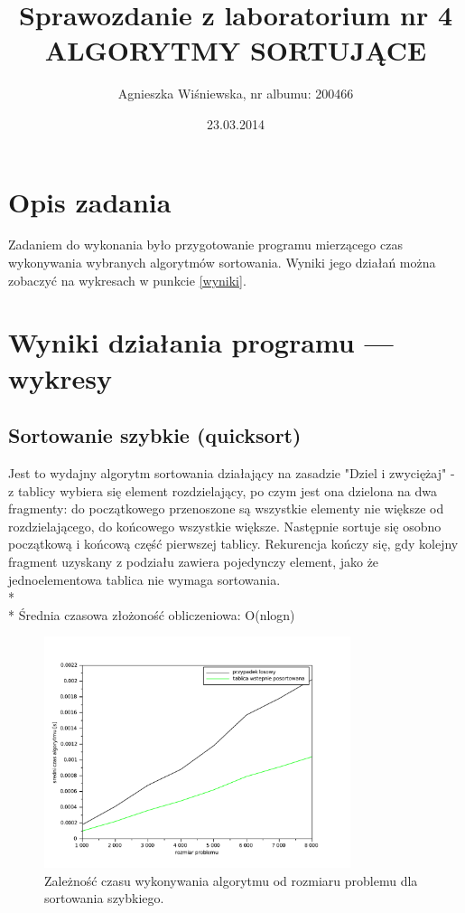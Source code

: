 \documentclass{mwart}
\title{\Huge{Sprawozdanie z laboratorium nr 4 \\
ALGORYTMY SORTUJĄCE}}
\author{Agnieszka Wiśniewska, nr albumu: 200466}
\date{23.03.2014}
\begin{document}
\maketitle

\section{Opis zadania\label{wstep}}

Zadaniem do wykonania było przygotowanie programu mierzącego czas wykonywania wybranych algorytmów sortowania. Wyniki jego działań można zobaczyć na wykresach w punkcie \ref{wyniki}.

\section{Wyniki działania programu --- wykresy\label{wyniki}}
\subsection {Sortowanie szybkie (quicksort)}
Jest to wydajny algorytm sortowania działający na zasadzie "Dziel i zwyciężaj" - z tablicy wybiera się element rozdzielający, po czym jest ona dzielona na dwa fragmenty: do początkowego przenoszone są wszystkie elementy nie większe od rozdzielającego, do końcowego wszystkie większe. Następnie sortuje się osobno początkową i końcową część pierwszej tablicy. Rekurencja kończy się, gdy kolejny fragment uzyskany z podziału zawiera pojedynczy element, jako że jednoelementowa tablica nie wymaga sortowania.
\\*\\*
Średnia czasowa złożoność obliczeniowa: O(nlogn)
\begin{figure}[!htp]
\centering
\includegraphics[width=0.8\textwidth]{files/quick.pdf}
\caption{Zależność czasu wykonywania algorytmu od rozmiaru problemu dla sortowania szybkiego. \label{quicksort}} 
\end{figure}
\end{document}
